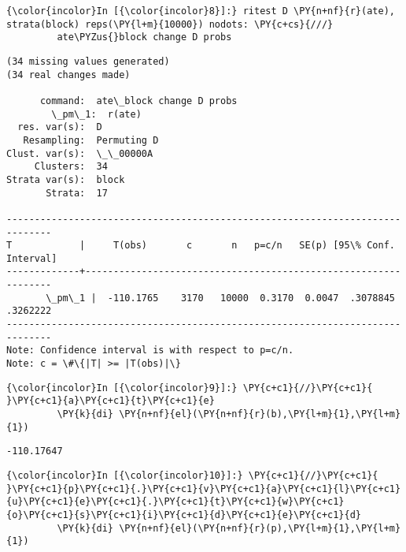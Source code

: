 \documentclass[11pt,notitlepage]{article}\usepackage[]{graphicx}\usepackage[]{color}
\makeatletter
\newenvironment{kframe}{%
 \def\at@end@of@kframe{}%
 \ifinner\ifhmode%
  \def\at@end@of@kframe{\end{minipage}}%
  \begin{minipage}{\columnwidth}%
 \fi\fi%
 \def\FrameCommand##1{\hskip\@totalleftmargin \hskip-\fboxsep
 \colorbox{shadecolor}{##1}\hskip-\fboxsep
     \hskip-\linewidth \hskip-\@totalleftmargin \hskip\columnwidth}%
 \MakeFramed {\advance\hsize-\width
   \@totalleftmargin\z@ \linewidth\hsize
   \@setminipage}}%
 {\par\unskip\endMakeFramed%
 \at@end@of@kframe}
\newenvironment{knitrout}{}{} %
\makeatother
\begin{document}
\begin{enumerate}[a)]
\begin{knitrout}
\begin{kframe}
    \begin{Verbatim}[commandchars=\\\{\}]
{\color{incolor}In [{\color{incolor}8}]:} ritest D \PY{n+nf}{r}(ate), strata(block) reps(\PY{l+m}{10000}) nodots: \PY{c+cs}{///}
         ate\PYZus{}block change D probs
\end{Verbatim}

    \begin{Verbatim}[commandchars=\\\{\}]
(34 missing values generated)
(34 real changes made)

      command:  ate\_block change D probs
        \_pm\_1:  r(ate)
  res. var(s):  D
   Resampling:  Permuting D
Clust. var(s):  \_\_00000A
     Clusters:  34
Strata var(s):  block
       Strata:  17

------------------------------------------------------------------------------
T            |     T(obs)       c       n   p=c/n   SE(p) [95\% Conf. Interval]
-------------+----------------------------------------------------------------
       \_pm\_1 |  -110.1765    3170   10000  0.3170  0.0047  .3078845   .3262222
------------------------------------------------------------------------------
Note: Confidence interval is with respect to p=c/n.
Note: c = \#\{|T| >= |T(obs)|\}

    \end{Verbatim}

    \begin{Verbatim}[commandchars=\\\{\}]
{\color{incolor}In [{\color{incolor}9}]:} \PY{c+c1}{//}\PY{c+c1}{ }\PY{c+c1}{a}\PY{c+c1}{t}\PY{c+c1}{e}
         \PY{k}{di} \PY{n+nf}{el}(\PY{n+nf}{r}(b),\PY{l+m}{1},\PY{l+m}{1})
\end{Verbatim}

    \begin{Verbatim}[commandchars=\\\{\}]
-110.17647

    \end{Verbatim}

    \begin{Verbatim}[commandchars=\\\{\}]
{\color{incolor}In [{\color{incolor}10}]:} \PY{c+c1}{//}\PY{c+c1}{ }\PY{c+c1}{p}\PY{c+c1}{.}\PY{c+c1}{v}\PY{c+c1}{a}\PY{c+c1}{l}\PY{c+c1}{u}\PY{c+c1}{e}\PY{c+c1}{.}\PY{c+c1}{t}\PY{c+c1}{w}\PY{c+c1}{o}\PY{c+c1}{s}\PY{c+c1}{i}\PY{c+c1}{d}\PY{c+c1}{e}\PY{c+c1}{d}
         \PY{k}{di} \PY{n+nf}{el}(\PY{n+nf}{r}(p),\PY{l+m}{1},\PY{l+m}{1})
\end{Verbatim}


\end{kframe}
\end{knitrout}
\end{enumerate}
\end{document}
